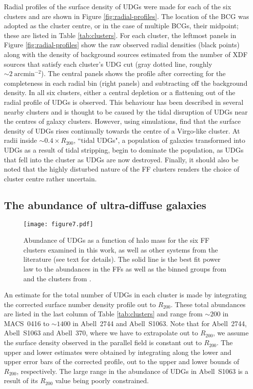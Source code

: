 \documentclass[iop,tighten,twocolumn,apj,floatfix]{emulateapj}
\begin{document}
Radial profiles of the surface density of UDGs were made for each of the six
clusters and are shown in Figure \ref{fig:radial-profiles}. The location of
the BCG was adopted as the cluster centre, or in the case of multiple BCGs,
their midpoint; these are listed in Table \ref{tab:clusters}.  For each
cluster, the leftmost panels in Figure \ref{fig:radial-profiles} show the raw
observed radial densities (black points) along with the density of background
sources estimated from the number of XDF sources that satisfy each cluster's
UDG cut (gray dotted line, roughly ${\sim}2~\mathrm{arcmin}^{-2}$).
The central panels shows the profile after correcting
for the completeness in each radial bin (right panels) and subtracting off the
background density.
In all six clusters, either a central depletion or a flattening out of the
radial profile of UDGs is observed.
This behaviour has been described in several nearby clusters
\citep[e.g.][]{vdb2016, mancerapina2018} and is thought to be caused by the
tidal disruption of UDGs near the centres of galaxy clusters.
However, using simulations, \cite{sales2019} find that the surface density of
UDGs rises continually towards the centre of a Virgo-like cluster.
At radii inside ${\sim}0.4 \times R_{200}$, ``tidal UDGs", a population of
galaxies transformed into UDGs as a result of tidal stripping, begin to
dominate the population, as UDGs that fell into the cluster as UDGs are now
destroyed.
Finally, it should also be noted that the highly disturbed nature of the
FF clusters renders the choice of cluster centre rather
uncertain.

\subsection{The abundance of ultra-diffuse galaxies}

\begin{figure}
	\texttt{[image: figure7.pdf]}
	\caption{
    Abundance of UDGs as a function of halo mass for the six FF clusters
    examined in this work, as well as other systems from the literature (see
    text for details).
    The solid line is the best fit power law to the abundances in the FFs as well
    as the binned groups from \cite{vdb2017} and the clusters from
    \cite{vdb2016}.
    \label{fig:abundance}
	}
\end{figure}

An estimate for the total number of UDGs in each cluster is made by
integrating the corrected surface number density profile out to $R_{200}$.
These total abundances are listed in the last column of Table
\ref{tab:clusters} and range from ${\sim}200$ in MACS~0416 to ${\sim}1400$ in
Abell~2744 and Abell~S1063.
Note that for Abell~2744, Abell~S1063 and Abell~370, where we have to extrapolate
out to $R_{200}$, we assume the surface density observed in the parallel field
is constant out to $R_{200}$.
The upper and lower estimates were obtained by integrating along the lower and
upper error bars of the corrected profile, out to the upper and lower bounds
of $R_{200}$, respectively.
The large range in the abundance of UDGs in Abell~S1063 is a result of
its $R_{200}$ value being poorly constrained.
\end{document}
